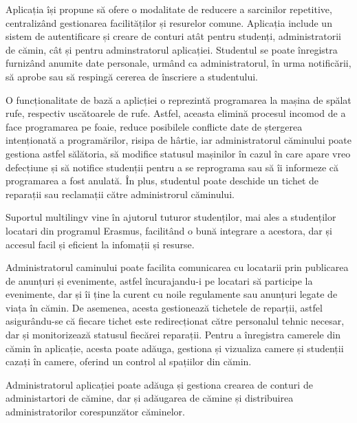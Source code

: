\documentclass[12pt,a4paper]{report}
\theoremstyle{definition}
\theoremstyle{remark}
\begin{document}
\par Aplicația își propune să ofere o modalitate de reducere a sarcinilor repetitive, centralizând gestionarea facilităților și resurelor comune. Aplicația include un sistem de autentificare și creare de conturi atât pentru studenți, administratorii de cămin, cât și pentru adminstratorul aplicației. Studentul se poate înregistra furnizând anumite date personale, urmând ca administratorul, în urma notificării, să aprobe sau să respingă cererea de înscriere a studentului. 
\par O funcționalitate de bază a aplicției o reprezintă programarea la mașina de spălat rufe, respectiv uscătoarele de rufe. Astfel, aceasta elimină procesul incomod de a face programarea pe foaie, reduce posibilele conflicte date de ștergerea intenționată a programărilor, risipa de hârtie, iar administratorul căminului poate gestiona astfel sălătoria, să modifice statusul mașinilor în cazul în care apare vreo defecțiune și să notifice studenții pentru a se reprograma sau să îi informeze că programarea a fost anulată. În plus, studentul poate deschide un tichet de reparații sau reclamații către administrorul căminului.
\par Suportul multilingv vine în ajutorul tuturor studenților, mai ales a studenților locatari din programul Erasmus, facilitând o bună integrare a acestora, dar și accesul facil și eficient la infomații și resurse.
\par Administratorul caminului poate facilita comunicarea cu locatarii prin publicarea de anunțuri și evenimente, astfel încurajandu-i pe locatari să participe la evenimente, dar și îi ține la curent cu noile regulamente sau anunțuri legate de viața în cămin.
De asemenea, acesta gestionează tichetele de reparții, astfel asigurându-se că fiecare tichet este redirecționat către personalul tehnic necesar, dar și monitorizează statusul fiecărei reparații. Pentru a înregistra camerele din cămin în aplicație, acesta poate adăuga, gestiona și vizualiza camere și studenții cazați în camere, oferind un control al spațiilor din cămin.
\par Administratorul aplicației poate adăuga și gestiona crearea de conturi de administartori de cămine, dar și adăugarea de cămine și distribuirea administratorilor corespunzător căminelor.
\end{document}
